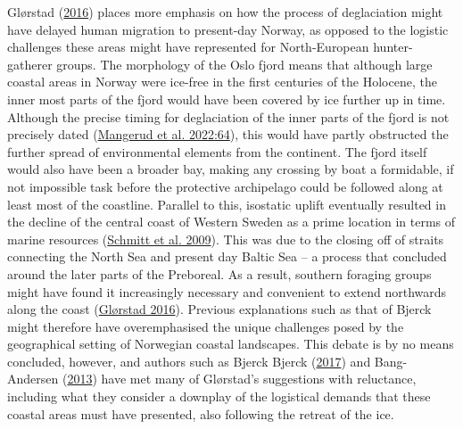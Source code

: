\documentclass[
  a4paper,
  oneside]{uiophdthesis}
\begin{document}
Glørstad (\protect\hyperlink{ref-glorstad2016}{2016}) places more emphasis on how the process of deglaciation might have delayed human migration to present-day Norway, as opposed to the logistic challenges these areas might have represented for North-European hunter-gatherer groups. The morphology of the Oslo fjord means that although large coastal areas in Norway were ice-free in the first centuries of the Holocene, the inner most parts of the fjord would have been covered by ice further up in time. Although the precise timing for deglaciation of the inner parts of the fjord is not precisely dated (\protect\hyperlink{ref-mangerud2022}{Mangerud et al. 2022:64}), this would have partly obstructed the further spread of environmental elements from the continent. The fjord itself would also have been a broader bay, making any crossing by boat a formidable, if not impossible task before the protective archipelago could be followed along at least most of the coastline. Parallel to this, isostatic uplift eventually resulted in the decline of the central coast of Western Sweden as a prime location in terms of marine resources (\protect\hyperlink{ref-schmitt2009}{Schmitt et al. 2009}). This was due to the closing off of straits connecting the North Sea and present day Baltic Sea -- a process that concluded around the later parts of the Preboreal. As a result, southern foraging groups might have found it increasingly necessary and convenient to extend northwards along the coast (\protect\hyperlink{ref-glorstad2016}{Glørstad 2016}). Previous explanations such as that of Bjerck might therefore have overemphasised the unique challenges posed by the geographical setting of Norwegian coastal landscapes. This debate is by no means concluded, however, and authors such as Bjerck Bjerck (\protect\hyperlink{ref-bjerck2017}{2017}) and Bang-Andersen (\protect\hyperlink{ref-bang-andersen2013}{2013}) have met many of Glørstad's suggestions with reluctance, including what they consider a downplay of the logistical demands that these coastal areas must have presented, also following the retreat of the ice.
\end{document}
